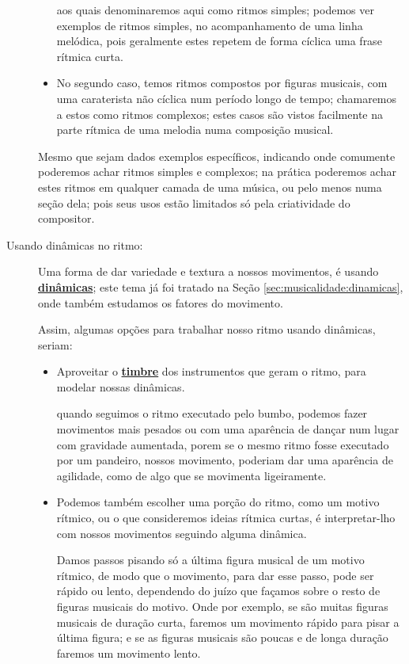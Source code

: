 \begin{description}
\begin{itemize}
aos quais denominaremos aqui como ritmos simples; podemos ver exemplos de ritmos simples,
no acompanhamento de uma linha melódica, 
pois geralmente estes repetem de forma cíclica uma frase rítmica curta.
\item No segundo caso, temos  ritmos compostos por figuras musicais,
com uma caraterista não cíclica num período longo de tempo; 
chamaremos a estos como ritmos complexos;
estes casos são vistos facilmente na parte rítmica de uma melodia numa composição musical.
\end{itemize}
Mesmo que sejam dados exemplos específicos, 
indicando onde comumente poderemos achar ritmos simples e complexos;
na prática poderemos achar estes ritmos em qualquer camada de uma música,
ou pelo menos numa seção dela; 
pois seus usos estão limitados só pela criatividade do compositor.
\item [Usando dinâmicas no ritmo:] 
Uma forma de dar variedade e textura a nossos movimentos, 
é usando \hyperref[sec:musicalidade:dinamicas]{\textbf{dinâmicas}}; este tema já foi tratado na Seção \ref{sec:musicalidade:dinamicas},
onde também estudamos os fatores do movimento.

Assim, algumas opções para trabalhar nosso ritmo usando dinâmicas, seriam:
\begin{itemize}
\item Aproveitar o \hyperref[sec:pos:timbre]{\textbf{timbre}} dos instrumentos que geram o ritmo,
para modelar nossas dinâmicas.
\begin{example}
quando seguimos  o ritmo executado pelo bumbo,
podemos fazer movimentos mais pesados ou com uma aparência de dançar num lugar com gravidade aumentada,
porem se o mesmo ritmo fosse executado por um pandeiro,
nossos movimento,
poderiam dar uma aparência de agilidade, 
como de algo que se movimenta ligeiramente.
\end{example}
\item Podemos também escolher uma porção do ritmo, como um motivo rítmico,
 ou o que consideremos ideias rítmica curtas,
é interpretar-lho com nossos movimentos seguindo alguma dinâmica.
\begin{example}
Damos passos pisando só a última figura musical de um motivo rítmico,
de modo que o movimento, para dar esse passo, pode ser rápido ou lento,
dependendo do juízo que façamos sobre o resto de figuras musicais do motivo.
Onde por exemplo, se são muitas figuras musicais de duração curta, 
faremos um movimento rápido para pisar a última figura;
e se as figuras musicais são poucas e de longa duração faremos um movimento lento.
\end{example}
\end{itemize}
\end{description}

